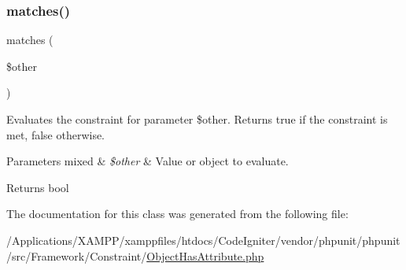\subsubsection{\texorpdfstring{matches()}{matches()}}
{\footnotesize\ttfamily matches (\begin{DoxyParamCaption}\item[{}]{\$other }\end{DoxyParamCaption})\hspace{0.3cm}{\ttfamily [protected]}}

Evaluates the constraint for parameter \$other. Returns true if the constraint is met, false otherwise.


\begin{DoxyParams}[1]{Parameters}
mixed & {\em \$other} & Value or object to evaluate.\\
\hline
\end{DoxyParams}
\begin{DoxyReturn}{Returns}
bool 
\end{DoxyReturn}


The documentation for this class was generated from the following file\+:\begin{DoxyCompactItemize}
\item 
/\+Applications/\+X\+A\+M\+P\+P/xamppfiles/htdocs/\+Code\+Igniter/vendor/phpunit/phpunit/src/\+Framework/\+Constraint/\mbox{\hyperlink{_object_has_attribute_8php}{Object\+Has\+Attribute.\+php}}\end{DoxyCompactItemize}
